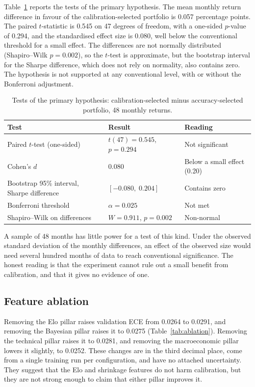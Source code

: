 \documentclass[11pt,a4paper]{article}
\begin{document}
Table~\ref{tab:stats} reports the tests of the primary hypothesis. The mean monthly return difference in favour of the calibration-selected portfolio is 0.057 percentage points. The paired $t$-statistic is 0.545 on 47 degrees of freedom, with a one-sided $p$-value of 0.294, and the standardised effect size is 0.080, well below the conventional threshold for a small effect. The differences are not normally distributed (Shapiro--Wilk $p=0.002$), so the $t$-test is approximate, but the bootstrap interval for the Sharpe difference, which does not rely on normality, also contains zero. The hypothesis is not supported at any conventional level, with or without the Bonferroni adjustment.

\begin{table}[t]
\centering\small
\caption{Tests of the primary hypothesis: calibration-selected minus accuracy-selected portfolio, 48 monthly returns.}
\label{tab:stats}
\begin{tabular}{@{}lll@{}}
\toprule
Test & Result & Reading \\
\midrule
Paired $t$-test (one-sided) & $t(47)=0.545$, $p=0.294$ & Not significant \\
Cohen's $d$ & 0.080 & Below a small effect (0.20) \\
Bootstrap 95\% interval, Sharpe difference & $[-0.080,\;0.204]$ & Contains zero \\
Bonferroni threshold & $\alpha=0.025$ & Not met \\
Shapiro--Wilk on differences & $W=0.911$, $p=0.002$ & Non-normal \\
\bottomrule
\end{tabular}
\end{table}

A sample of 48 months has little power for a test of this kind. Under the observed standard deviation of the monthly differences, an effect of the observed size would need several hundred months of data to reach conventional significance. The honest reading is that the experiment cannot rule out a small benefit from calibration, and that it gives no evidence of one.

\subsection{Feature ablation}

Removing the Elo pillar raises validation ECE from 0.0264 to 0.0291, and removing the Bayesian pillar raises it to 0.0275 (Table~\ref{tab:ablation}). Removing the technical pillar raises it to 0.0281, and removing the macroeconomic pillar lowers it slightly, to 0.0252. These changes are in the third decimal place, come from a single training run per configuration, and have no attached uncertainty. They suggest that the Elo and shrinkage features do not harm calibration, but they are not strong enough to claim that either pillar improves it.
\end{document}
